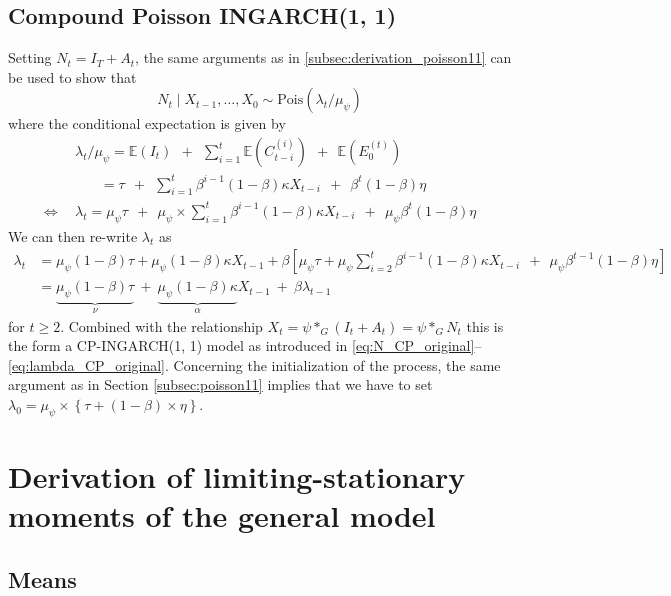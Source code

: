 \documentclass{article}
\begin{document}
\subsection{Compound Poisson INGARCH(1, 1)}

Setting $N_t = I_T + A_t$, the same arguments as in \eqref{subsec:derivation_poisson11} can be used to show that
$$
N_t \mid X_{t - 1}, \dots, X_0 \sim \text{Pois}(\lambda_t/\mu_\psi)
$$
where the conditional expectation is given by
\begin{align*}
& \lambda_t/\mu_\psi = \mathbb{E}(I_t) \ \ + \ \ \sum_{i = 1}^t \mathbb{E}(C_{t - i}^{(i)}) \ \ + \ \ \mathbb{E}(E_0^{(t)})\\
& \ \ \ \ \ \ \ \ = \tau \ \ + \ \ \sum_{i = 1}^t \beta^{i - 1}(1 - \beta)\kappa X_{t - i} \ \ + \ \ \beta^{t}(1 - \beta)\eta\\
\Leftrightarrow \ \ & \lambda_t = \mu_\psi \tau \ \ + \ \ \mu_\psi \times \sum_{i = 1}^t \beta^{i - 1}(1 - \beta)\kappa X_{t - i} \ \ + \ \ \mu_\psi\beta^{t}(1 - \beta)\eta
\end{align*}
We can then re-write $\lambda_t$ as
\begin{align*}
\lambda_t & = \mu_\psi(1 - \beta)\tau + \mu_\psi(1 - \beta)\kappa X_{t - 1} + \beta \left[\mu_\psi\tau +   \mu_\psi \sum_{i = 2}^t \beta^{i - 1}(1 - \beta)\kappa X_{t - i}  \ \ + \ \ \mu_\psi\beta^{t - 1}(1 - \beta)\eta\right]\\
& = \underbrace{\mu_\psi(1 - \beta)\tau}_{\nu} \ + \ \underbrace{\mu_\psi(1 - \beta)\kappa}_{\alpha} X_{t - 1} \ + \ \beta \lambda_{t - 1}
\end{align*}
for $t \geq 2$. Combined with the relationship $X_t = \psi *_G (I_t + A_t) = \psi *_G N_t$ this is the form a CP-INGARCH(1, 1) model as introduced in \eqref{eq:N_CP_original}--\eqref{eq:lambda_CP_original}. Concerning the initialization of the process, the same argument as in Section \ref{subsec:poisson11} implies that we have to set $\lambda_0 = \mu_\psi\times \left\{\tau + (1 - \beta) \times \eta\right\}$.


\section{Derivation of limiting-stationary moments of the general model}

\subsection{Means}
\end{document}
